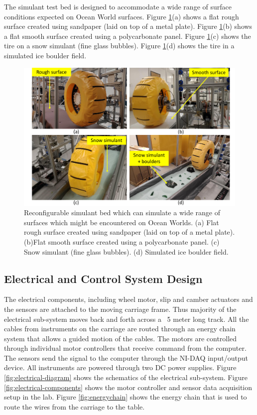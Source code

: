 \documentclass{article}
\begin{document}
The simulant test bed is designed to accommodate a wide range of surface conditions expected on Ocean World surfaces. Figure \ref{fig:simulants}(a) shows a flat rough surface created using sandpaper (laid on top of a metal plate).  Figure \ref{fig:simulants}(b) shows a flat smooth surface created using a polycarbonate panel. Figure \ref{fig:simulants}(c) shows the tire on a snow simulant (fine glass bubbles). Figure \ref{fig:simulants}(d) shows the tire in a simulated ice boulder field. 
\begin{figure}[hbt!]
\centering
\includegraphics[width=6.00in]{test-rig-images/simulants.pdf}
\caption{Reconfigurable simulant bed which can simulate a wide range of surfaces which might be encountered on Ocean Worlds. (a) Flat rough surface created using sandpaper (laid on top of a metal plate).  (b)Flat smooth surface created using a polycarbonate panel. (c) Snow simulant (fine glass bubbles). (d) Simulated ice boulder field. }
\label{fig:simulants}
\end{figure}

\subsection{Electrical and Control System Design}

The electrical components, including wheel motor, slip and camber actuators and the sensors are attached to the moving carriage frame. Thus majority of the electrical sub-system moves back and forth across a ~5 meter long track. All the cables from instruments on the carriage are routed through an energy chain system that allows a guided motion of the cables. The motors are controlled through individual motor controllers that receive command from the computer. The sensors send the signal to the computer through the NI-DAQ input/output device. All instruments are powered through two DC power supplies. Figure \ref{fig:electrical-diagram} shows the schematics of the electrical sub-system. Figure \ref{fig:electrical-components} shows the motor controller and sensor data acquisition setup in the lab. Figure \ref{fig:energychain} shows the energy chain that is used to route the wires from the carriage to the table.  
\end{document}
